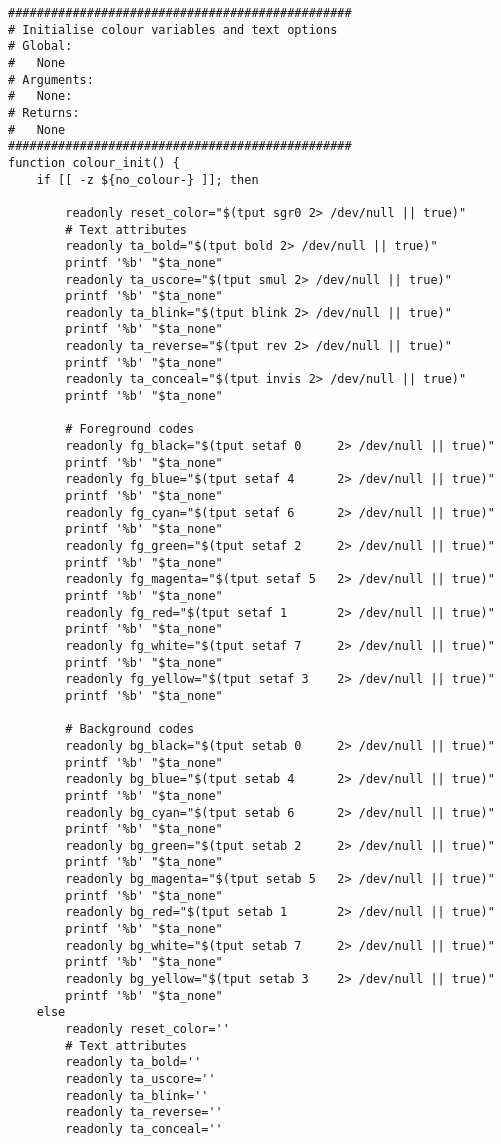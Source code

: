 \documentclass[11pt]{article}
\begin{document}
\begin{verbatim}
################################################
# Initialise colour variables and text options
# Global: 
#   None
# Arguments:
#   None:
# Returns:
#   None
################################################
function colour_init() {
    if [[ -z ${no_colour-} ]]; then

        readonly reset_color="$(tput sgr0 2> /dev/null || true)"
        # Text attributes
        readonly ta_bold="$(tput bold 2> /dev/null || true)"
        printf '%b' "$ta_none"
        readonly ta_uscore="$(tput smul 2> /dev/null || true)"
        printf '%b' "$ta_none"
        readonly ta_blink="$(tput blink 2> /dev/null || true)"
        printf '%b' "$ta_none"
        readonly ta_reverse="$(tput rev 2> /dev/null || true)"
        printf '%b' "$ta_none"
        readonly ta_conceal="$(tput invis 2> /dev/null || true)"
        printf '%b' "$ta_none"

        # Foreground codes
        readonly fg_black="$(tput setaf 0     2> /dev/null || true)"
        printf '%b' "$ta_none"
        readonly fg_blue="$(tput setaf 4      2> /dev/null || true)"
        printf '%b' "$ta_none"
        readonly fg_cyan="$(tput setaf 6      2> /dev/null || true)"
        printf '%b' "$ta_none"
        readonly fg_green="$(tput setaf 2     2> /dev/null || true)"
        printf '%b' "$ta_none"
        readonly fg_magenta="$(tput setaf 5   2> /dev/null || true)"
        printf '%b' "$ta_none"
        readonly fg_red="$(tput setaf 1       2> /dev/null || true)"
        printf '%b' "$ta_none"
        readonly fg_white="$(tput setaf 7     2> /dev/null || true)"
        printf '%b' "$ta_none"
        readonly fg_yellow="$(tput setaf 3    2> /dev/null || true)"
        printf '%b' "$ta_none"

        # Background codes
        readonly bg_black="$(tput setab 0     2> /dev/null || true)"
        printf '%b' "$ta_none"
        readonly bg_blue="$(tput setab 4      2> /dev/null || true)"
        printf '%b' "$ta_none"
        readonly bg_cyan="$(tput setab 6      2> /dev/null || true)"
        printf '%b' "$ta_none"
        readonly bg_green="$(tput setab 2     2> /dev/null || true)"
        printf '%b' "$ta_none"
        readonly bg_magenta="$(tput setab 5   2> /dev/null || true)"
        printf '%b' "$ta_none"
        readonly bg_red="$(tput setab 1       2> /dev/null || true)"
        printf '%b' "$ta_none"
        readonly bg_white="$(tput setab 7     2> /dev/null || true)"
        printf '%b' "$ta_none"
        readonly bg_yellow="$(tput setab 3    2> /dev/null || true)"
        printf '%b' "$ta_none"
    else
        readonly reset_color=''
        # Text attributes
        readonly ta_bold=''
        readonly ta_uscore=''
        readonly ta_blink=''
        readonly ta_reverse=''
        readonly ta_conceal=''


\end{verbatim}
\end{document}
